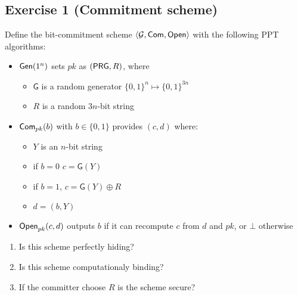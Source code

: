 
\section{}


\subsection{Exercise 1 (Commitment scheme)}
\label{subsec:commit-scheme}

Define the bit-commitment scheme $\langle \mathcal{G}, \operatorname{\mathsf{Com}}, \operatorname{\mathsf{Open}} \rangle$ with the following PPT algorithms:
\begin{itemize}
	\item $\operatorname{\mathsf{Gen}}(1^n)$ sets $pk$ as $(\operatorname{\mathsf{PRG}},R)$, where
	\begin{itemize}
		\item $\mathsf{G}$ is a random generator $\lbrace 0,1 \rbrace^n \longmapsto \lbrace 0,1\rbrace^{3n}$
		\item $R$ is a random $3n$-bit string
	\end{itemize}
	\item $\operatorname{\mathsf{Com}}_{pk}(b)$ with $b\in\{0,1\}$ provides $(c,d)$ where:
	\begin{itemize}
		\item $Y$ is an $n$-bit string
		\item  if $b=0$ $c=\mathsf{G}(Y)$
		\item if $b=1$, $c=\mathsf{G}(Y) \oplus R$
		\item $d=(b,Y)$
	\end{itemize}
	\item $\operatorname{\mathsf{Open}}_{pk}(c,d)$ outputs $b$ if it can recompute $c$ from $d$ and $pk$, or $\bot$ otherwise
\end{itemize}

\begin{enumerate}
	\item Is this scheme perfectly hiding?
	\item Is this scheme computationaly binding?
	\item If the committer choose $R$ is the scheme secure?
\end{enumerate}



